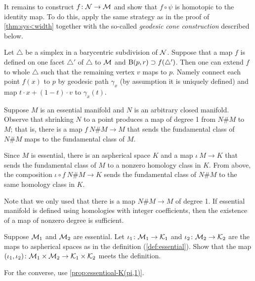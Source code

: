 It remains to construct $f\colon\mathcal{N}\to\mathcal{M}$ and show that $f\circ\psi$ is homotopic to the identity map.
To do this, apply the same strategy as in the proof of \ref{thm:sys<width} together with the so-called \emph{geodesic cone construction}
described below.

Let $\triangle$ be a simplex in a barycentric subdivision of $\mathcal{N}$.
Suppose that a map $f$ is defined on one facet $\triangle'$ of $\triangle$ to $\mathcal{M}$ and $\mathrm{B}{}(p,r)\supset f(\triangle')$.
Then one can extend $f$ to whole $\triangle$ such that the remaining vertex $v$ maps to $p$.
Namely connect each point $f(x)$ to $p$ by geodesic path $\gamma_x$ (by assumption it is uniquely defined) and map $t\cdot x+(1-t)\cdot v$ to $\gamma_x(t)$.
  

Suppose $M$ is an essential manifold and $N$ is an arbitrary closed manifold.
Observe that shrinking $N$ to a point produces a map of degree 1 from $N\#M$ to $M$; that is, there is a map $f\:N\#M\to M$ that sends the fundamental class of $N\#M$ maps to the fundamental class of $M$.

Since $M$ is essential, there is an aspherical space $K$ and a map $\iota\:M\to K$ that sends the fundamental class of $M$ to a nonzero homology class in $K$.
From above, the composition $\iota\circ f\:N\#M\to K$ sends the fundamental class of $N\#M$ to the same homology class in $K$.

 Note that we only used that there is a map $N\#M\to M$ of degree 1.
If essential manifold is defined using homologies with integer coefficients, then the existence of a map of nonzero degree is sufficient.

Suppose $\mathcal{M}_1$ and $\mathcal{M}_2$ are essential.
Let $\iota_1\colon\mathcal{M}_1\to\mathcal{K}_1$ and $\iota_2\colon\mathcal{M}_2\to\mathcal{K}_2$ are the maps to aspherical spaces as in the definition (\ref{def:essential}).
Show that the map
$(\iota_1,\iota_2)\colon\mathcal{M}_1\times\mathcal{M}_2\to\mathcal{K}_1\times\mathcal{K}_2$
meets the definition.

For the converse, use \ref{prop:essentioal-K(pi,1)}.

